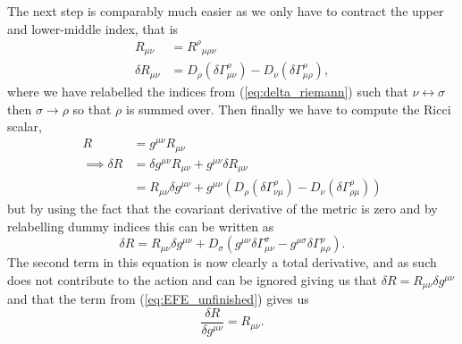 \documentclass[12pt]{article}
\numberwithin{equation}{section}
\numberwithin{figure}{section}
\begin{document}
The next step is comparably much easier as we only have to contract the upper and lower-middle index, that is
\begin{align}
	R_{\mu\nu} &= {R^\rho}_{\mu\rho\nu}\\
	\delta R_{\mu\nu} &= D_\rho(\delta \Gamma^\rho_{\mu\nu}) - D_\nu(\delta \Gamma^\rho_{\mu\rho}),
\end{align}
where we have relabelled the indices from (\ref{eq:delta_riemann}) such that $\nu\leftrightarrow\sigma$ then $\sigma\rightarrow\rho$ so that $\rho$ is summed over. Then finally we have to compute the Ricci scalar,
\begin{align}
R &= g^{\mu\nu} R_{\mu\nu}\\
\implies \delta R &= \delta g^{\mu\nu}R_{\mu\nu} + g^{\mu\nu} \delta R_{\mu\nu}\\
&= R_{\mu\nu}\delta g^{\mu\nu} + g^{\mu\nu}(D_\rho(\delta \Gamma^{\rho}_{\nu\mu}) - D_\nu(\delta \Gamma^{\rho}_{\rho\mu}))
\end{align}
but by using the fact that the covariant derivative of the metric is zero and by relabelling dummy indices this can be written as
\begin{equation}
	\delta R = R_{\mu\nu}\delta g^{\mu\nu} + D_\sigma(g^{\mu\nu}\delta \Gamma^{\sigma}_{\mu\nu} - g^{\mu\sigma}\delta \Gamma^{\rho}_{\mu\rho}).
\end{equation}
The second term in this equation is now clearly a total derivative, and as such does not contribute to the action and can be ignored giving us that $\delta R = R_{\mu\nu}\delta g^{\mu\nu}$ and that the term from (\ref{eq:EFE_unfinished}) gives us
\begin{equation}
	\frac{\delta R}{\delta g^{\mu\nu}} = R_{\mu\nu}.
\end{equation}
\end{document}
